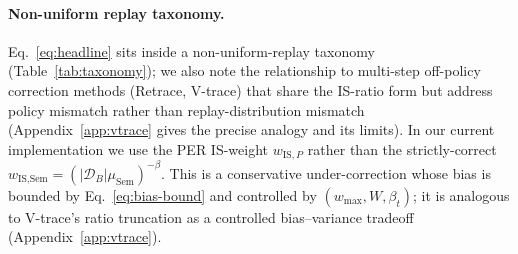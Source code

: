 \documentclass{article}
\begin{document}
\paragraph{Non-uniform replay taxonomy.}
Eq.~\eqref{eq:headline} sits inside a non-uniform-replay taxonomy
(Table~\ref{tab:taxonomy}); we also note the relationship to multi-step
off-policy correction methods (Retrace, V-trace) that share the IS-ratio
form but address policy mismatch rather than replay-distribution mismatch
(Appendix~\ref{app:vtrace} gives the precise analogy and its limits).
In our current implementation we use the
PER IS-weight $w_{\text{IS},P}$ rather than the strictly-correct
$w_{\text{IS},\text{Sem}}=(|\mathcal{D}_B|\mu_{\text{Sem}})^{-\beta}$. This is a
conservative under-correction whose bias is bounded by
Eq.~\eqref{eq:bias-bound} and controlled by $(w_{\max},W,\beta_t)$;
it is analogous to V-trace's ratio truncation as a controlled bias--variance
tradeoff (Appendix~\ref{app:vtrace}).
\end{document}
